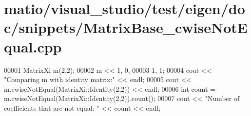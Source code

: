 \hypertarget{matio_2visual__studio_2test_2eigen_2doc_2snippets_2_matrix_base__cwise_not_equal_8cpp_source}{}\section{matio/visual\+\_\+studio/test/eigen/doc/snippets/\+Matrix\+Base\+\_\+cwise\+Not\+Equal.cpp}
\label{matio_2visual__studio_2test_2eigen_2doc_2snippets_2_matrix_base__cwise_not_equal_8cpp_source}

\begin{DoxyCode}
00001 MatrixXi m(2,2);
00002 m << 1, 0,
00003      1, 1;
00004 cout << \textcolor{stringliteral}{"Comparing m with identity matrix:"} << endl;
00005 cout << m.cwiseNotEqual(MatrixXi::Identity(2,2)) << endl;
00006 \textcolor{keywordtype}{int} count = m.cwiseNotEqual(MatrixXi::Identity(2,2)).count();
00007 cout << \textcolor{stringliteral}{"Number of coefficients that are not equal: "} << count << endl;
\end{DoxyCode}
